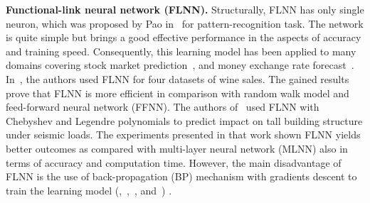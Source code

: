 \documentclass[runningheads]{llncs}
\begin{document}
\textbf{Functional-link neural network (FLNN).} 
Structurally, FLNN has only single neuron, which was proposed by Pao in~\cite{ref_pao} for pattern-recognition task. The network is quite simple but brings a good effective performance in the aspects of accuracy and training speed. Consequently, this learning model has been applied to many domains covering stock market prediction~\cite{ref_majhi}, and money exchange rate forecast~\cite{ref_rout}. In~\cite{ref_khan}, the authors used FLNN for four datasets of wine sales.
The gained results prove that FLNN is more efficient in comparison with random walk model and feed-forward neural network (FFNN). The authors of~\cite{ref_sahoo} used FLNN with Chebyshev and Legendre polynomials to predict impact on tall building structure under seismic loads. The experiments presented in that work shown FLNN yields better outcomes as compared with multi-layer neural network (MLNN) also in terms of accuracy and computation time. However, the main disadvantage of FLNN is the use of back-propagation (BP) mechanism with gradients descent to train the learning model (\cite{ref_majhi},~\cite{ref_rout},~\cite{ref_khan}, and~\cite{ref_sahoo}) . 

\end{document}
